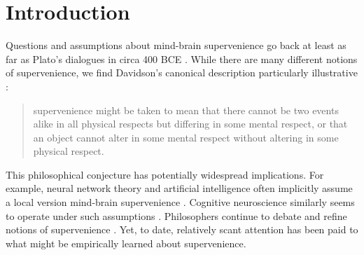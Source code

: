 \documentclass{article}
\begin{document}


\section*{Introduction}

\noindent Questions and assumptions about mind-brain supervenience go back at least as far as Plato's dialogues in circa 400 BCE \cite{Plato97}.  While there are many different notions of supervenience, we find Davidson's canonical description particularly illustrative \cite{Davidson70}:
\begin{quotation}
 supervenience might be taken to mean that there cannot be two events alike in all physical respects but differing in some mental respect, or that an object cannot alter in some mental respect without altering in some physical respect.
\end{quotation}
This philosophical conjecture has potentially widespread implications.  
For example, neural network theory and artificial intelligence often implicitly assume 
a local version mind-brain supervenience 
\cite{Haykin2008,Ripley2008}. Cognitive neuroscience similarly seems to operate under such assumptions
\cite{Gazzaniga2008}.  Philosophers continue to debate and refine notions of supervenience 
\cite{Kim2007}.  
Yet, to date, relatively scant attention has been paid to what might be empirically learned about supervenience.  
\end{document}
